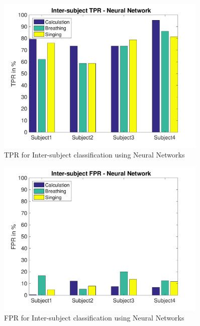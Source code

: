     	\begin{figure}[hbtp]
	    	\centering
	    	\includegraphics[width=0.90\textwidth]{Chapter-4/base_tprin}
	    	\caption{TPR for Inter-subject classification using Neural Networks}
	    	\label{fig:chap4InterNTPR}
    	\end{figure}

    	\begin{figure}[hbtp]
	    	\centering
	    	\includegraphics[width=0.90\textwidth]{Chapter-4/base_fprin}
	    	\caption{FPR for Inter-subject classification using Neural Networks}
	    	\label{fig:chap4InterNFPR}
    	\end{figure}

